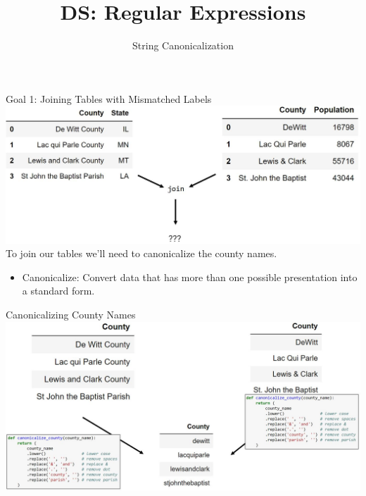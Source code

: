 \documentclass[aspectratio=169]{../latex_main/tntbeamer}  %
\title[Introduction]{DS: Regular Expressions}
\subtitle{String Canonicalization}
\begin{document}
	
	\maketitle
	\begin{frame}{Goal 1: Joining Tables with Mismatched Labels}
	    \includegraphics[scale=.38]{Bild1}\\
	    \pause
	    To join our tables we’ll need to canonicalize the county names.
	    \begin{itemize}
	        \item Canonicalize: Convert data that has more than one possible presentation into a standard form.
	    \end{itemize}
	\end{frame}
	
	
	
	\begin{frame}{Canonicalizing County Names}
	    \includegraphics[scale=.36]{Bild2}\\
	    
	\end{frame}
	
\end{document}
